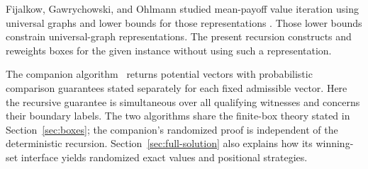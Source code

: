 Fijalkow, Gawrychowski, and Ohlmann studied mean-payoff value iteration
using universal graphs and lower bounds for those representations
\cite{FijalkowGawrychowskiOhlmann2020}. Those lower bounds constrain
universal-graph representations. The present recursion constructs and
reweights boxes for the given instance without using such a representation.

The companion algorithm~\cite{OpenAI2026Randomized} returns potential
vectors with probabilistic comparison guarantees stated separately
for each fixed admissible vector. Here the recursive guarantee is
simultaneous over all qualifying witnesses and concerns their boundary
labels. The two algorithms share the finite-box theory stated in
Section~\ref{sec:boxes}; the companion's randomized proof is
independent of the deterministic recursion. Section~\ref{sec:full-solution}
also explains how its winning-set interface yields randomized exact
values and positional strategies.
